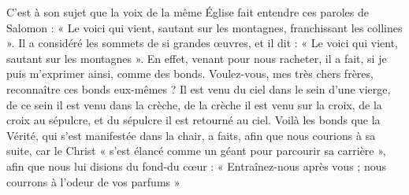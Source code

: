 C’est à son sujet que la voix de la même Église fait entendre ces paroles de Salomon : « Le voici qui vient, sautant sur les montagnes, franchissant les collines ». Il a considéré les sommets de si grandes œuvres, et il dit : « Le voici qui vient, sautant sur les montagnes ». En effet, venant pour nous racheter, il a fait, si je puis m’exprimer ainsi, comme des bonds. Voulez-vous, mes très chers frères, reconnaître ces bonds eux-mêmes ? Il est venu du ciel dans le sein d’une vierge, de ce sein il est venu dans la crèche, de la crèche il est venu sur la croix, de la croix au sépulcre, et du sépulcre il est retourné au ciel. Voilà les bonds que la Vérité, qui s’est manifestée dans la chair, a faits, afin que nous courions à sa suite, car le Christ « s’est élancé comme un géant pour parcourir sa carrière », afin que nous lui disions du fond-du cœur : « Entraînez-nous après vous ; nous courrons à l’odeur de vos parfums »